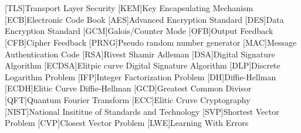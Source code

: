 \cleardoublepage
\chapter*{\listofabbrevname}
{}

\begin{acronym}[mmmmmmm]
	[TLS]{Transport Layer Security}
	[KEM]{Key Encapsulating Mechanism}
	[ECB]{Electronic Code Book}
	[AES]{Advanced Encryption Standard}
	[DES]{Data Encryption Standard}
	[GCM]{Galois/Counter Mode}
	[OFB]{Output Feedback}
	[CFB]{Cipher Feedback}
	[PRNG]{Pseudo random number generator}
	[MAC]{Message Authentication Code}
	[RSA]{Rivest Shamir Adleman}
	[DSA]{Digital Signature Algorithm}
	[ECDSA]{Elitpic curve Digital Signature Algorithm}
	[DLP]{Discrete Logarithm Problem}
	[IFP]{Integer Factorization Problem}
	[DH]{Diffie-Hellman}
	[ECDH]{Elitic Curve Diffie-Hellman}
	[GCD]{Greatest Common Divisor}
	[QFT]{Quantum Fourier Transform}
	[ECC]{Elitic Cruve Cryptography}
	[NIST]{National Insititue of Standards and Technology}
	[SVP]{Shortest Vector Problem}
	[CVP]{Closest Vector Problem}
	[LWE]{Learning With Errors}
\end{acronym}
